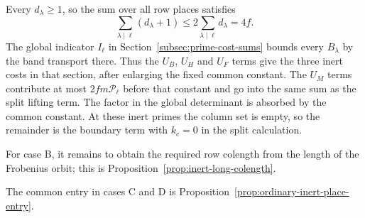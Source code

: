 Every \(d_\lambda\ge1\), so the sum over all row places satisfies
\[
 \sum_{\lambda\mid\ell}(d_\lambda+1)\le2\sum_{\lambda\mid\ell} d_\lambda=4f.
\]
The global indicator \(I_\ell\) in
Section~\ref{subsec:prime-cost-sums} bounds every \(B_\lambda\)
by the band transport there. Thus the \(U_B\), \(U_H\) and \(U_F\)
terms give the three inert costs in that section, after
enlarging the fixed common constant. The \(U_M\) terms contribute
at most \(2fm\mathcal P_\ell\) before that constant and go into
the same sum as the split lifting term. The factor in the
global determinant is absorbed by the common constant.
At these inert primes the column set is empty, so the remainder
is the boundary term with \(k_c=0\) in the split calculation.

For case B, it remains to obtain the required row colength from the length of the Frobenius orbit; this is Proposition~\ref{prop:inert-long-colength}.



The common entry in cases C and D is
Proposition~\ref{prop:ordinary-inert-place-entry}.


